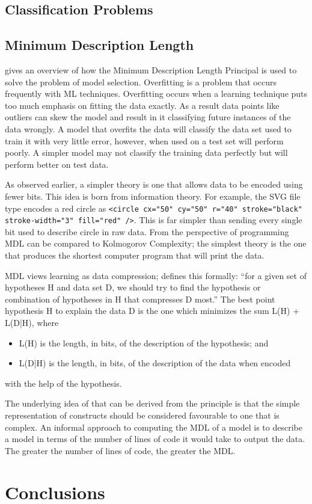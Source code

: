 \subsection{Classification Problems}

\subsection{Minimum Description Length}

\cite{grunwald2005tutorial} gives an overview of how the Minimum Description Length Principal is used to solve the problem of model selection. Overfitting is a problem that occurs frequently with ML techniques. Overfitting occurs when a learning technique puts too much emphasis on fitting the data exactly. As a result data points like outliers can skew the model and result in it classifying future instances of the data wrongly. A model that overfits the data will classify the data set used to train it with very little error, however, when used on a test set will perform poorly. A simpler model may not classify the training data perfectly but will perform better on test data.

As observed earlier, a simpler theory is one that allows data to be encoded using fewer bits. This idea is born from information theory. For example, the SVG file type encodes a red circle as \lstinline{<circle cx="50" cy="50" r="40" stroke="black" stroke-width="3" fill="red" />}. This is far simpler than sending every single bit used to describe circle in raw data. From the perspective of programming MDL can be compared to Kolmogorov Complexity; the simplest theory is the one that produces the shortest computer program that will print the data.

MDL views learning as data compression; \cite{grunwald2005tutorial} defines this formally: ``for a given set of hypotheses H and data set D, we should try to find the hypothesis or combination of hypotheses in H that compresses D most.'' The best point hypothesis H to explain the data D is the one which minimizes the sum L(H) + L(D|H), where
\begin{itemize}
  \item L(H) is the length, in bits, of the description of the hypothesis; and
  \item L(D|H) is the length, in bits, of the description of the data when encoded
\end{itemize}
with the help of the hypothesis.

The underlying idea of that can be derived from the principle is that the simple representation of constructs should be considered favourable to one that is complex. An informal approach to computing the MDL of a model is to describe a model in terms of the number of lines of code it would take to output the data. The greater the number of lines of code, the greater the MDL.



\section{Conclusions}


